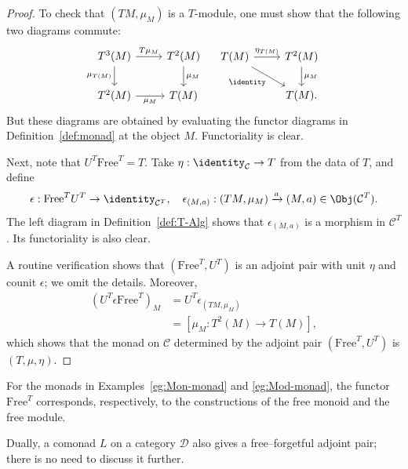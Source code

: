\begin{proof}
	To check that $(TM,\mu_M)$ is a $T$-module, one must show that the following
	two diagrams commute:
	\[\begin{tikzcd}
		T^3 (M) \arrow[r, "T\mu_M"] \arrow[d, "\mu_{T(M)}"'] & T^2(M) \arrow[d, "\mu_M"] \\
		T^2 (M) \arrow[r, "\mu_M"'] & T(M)
	\end{tikzcd} \quad \begin{tikzcd}
		T(M) \arrow[r, "\eta_{T(M)}"] \arrow[rd, "\identity"'] & T^2(M) \arrow[d, "\mu_M"] \\
		& T(M).
	\end{tikzcd}\]
	But these diagrams are obtained by evaluating the functor diagrams in
	Definition~\ref{def:monad} at the object $M$. Functoriality is clear.

	Next, note that $U^T\mathrm{Free}^T=T$. Take
	$\eta:\identity_{\mathcal{C}}\to T$ from the data of $T$, and define
	\[ \epsilon: \mathrm{Free}^T U^T \to \identity_{\mathcal{C}^T}, \quad
	\epsilon_{(M, a)}: (TM, \mu_M) \xrightarrow{a} (M, a) \in \Obj(\mathcal{C}^T). \]
	The left diagram in Definition~\ref{def:T-Alg} shows that
	$\epsilon_{(M,a)}$ is a morphism in $\mathcal{C}^T$. Its functoriality is
	also clear.

	A routine verification shows that $(\mathrm{Free}^T,U^T)$ is an adjoint
	pair with unit $\eta$ and counit $\epsilon$; we omit the details. Moreover,
	\begin{equation*}\begin{aligned}
		\left(U^T \epsilon \mathrm{Free}^T\right)_M & = U^T \epsilon_{(TM, \mu_M)} \\
		& = \left[ \mu_M: T^2(M) \to T(M)\right],
	\end{aligned}\end{equation*}
	which shows that the monad on $\mathcal{C}$ determined by the adjoint pair
	$(\mathrm{Free}^T,U^T)$ is $(T,\mu,\eta)$.
\end{proof}

For the monads in Examples~\ref{eg:Mon-monad} and \ref{eg:Mod-monad}, the
functor $\mathrm{Free}^T$ corresponds, respectively, to the constructions of
the free monoid and the free module.

Dually, a comonad $L$ on a category $\mathcal{D}$ also gives a
free--forgetful adjoint pair; there is no need to discuss it further.
